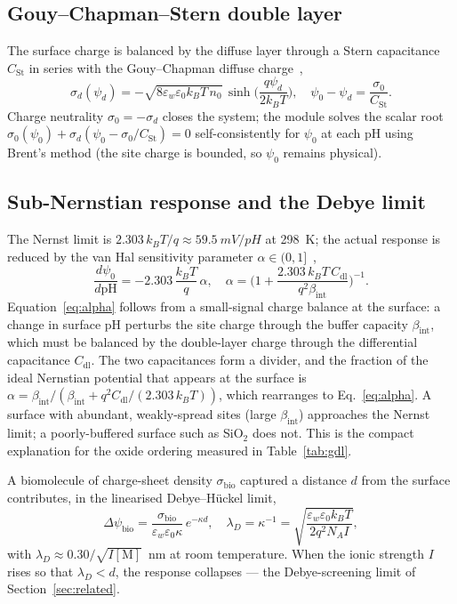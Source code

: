 \documentclass[10pt,journal]{IEEEtran}
\begin{document}
\subsection{Gouy--Chapman--Stern double layer}
The surface charge is balanced by the diffuse layer through a Stern capacitance
$C_{\mathrm{St}}$ in series with the Gouy--Chapman diffuse charge~\cite{grahame1947,bard2001},
\begin{equation}
  \sigma_d(\psi_d)=-\sqrt{8\varepsilon_w\varepsilon_0 k_BT\,n_0}\,
  \sinh\!\Big(\frac{q\psi_d}{2k_BT}\Big),\quad
  \psi_0-\psi_d=\frac{\sigma_0}{C_{\mathrm{St}}}.
  \label{eq:gc}
\end{equation}
Charge neutrality $\sigma_0=-\sigma_d$ closes the system; the module solves the
scalar root
$\sigma_0(\psi_0)+\sigma_d(\psi_0-\sigma_0/C_{\mathrm{St}})=0$
self-consistently for $\psi_0$ at each pH using Brent's method (the site charge is
bounded, so $\psi_0$ remains physical).

\subsection{Sub-Nernstian response and the Debye limit}
The Nernst limit is $2.303\,k_BT/q\approx\SI{59.5}{mV/pH}$ at \SI{298}{K}; the
actual response is reduced by the van Hal sensitivity parameter
$\alpha\in(0,1]$~\cite{vanhal1996},
\begin{equation}
  \frac{d\psi_0}{d\mathrm{pH}}=-2.303\,\frac{k_BT}{q}\,\alpha,\quad
  \alpha=\Big(1+\frac{2.303\,k_BT\,C_{\mathrm{dl}}}{q^2\beta_{\mathrm{int}}}\Big)^{-1}.
  \label{eq:alpha}
\end{equation}
Equation~\eqref{eq:alpha} follows from a small-signal charge balance at the
surface: a change in surface pH perturbs the site charge through the buffer
capacity $\beta_{\mathrm{int}}$, which must be balanced by the double-layer charge
through the differential capacitance $C_{\mathrm{dl}}$. The two capacitances form
a divider, and the fraction of the ideal Nernstian potential that appears at the
surface is $\alpha=\beta_{\mathrm{int}}/(\beta_{\mathrm{int}}+q^2 C_{\mathrm{dl}}/(2.303\,k_BT))$,
which rearranges to Eq.~\eqref{eq:alpha}. A surface with abundant, weakly-spread
sites (large $\beta_{\mathrm{int}}$) approaches the Nernst limit; a poorly-buffered
surface such as SiO$_2$ does not. This is the compact explanation for the oxide
ordering measured in Table~\ref{tab:gdl}.

A biomolecule of charge-sheet density $\sigma_{\mathrm{bio}}$ captured a distance
$d$ from the surface contributes, in the linearised Debye--H\"uckel limit,
\begin{equation}
  \Delta\psi_{\mathrm{bio}}=\frac{\sigma_{\mathrm{bio}}}{\varepsilon_w\varepsilon_0\kappa}\,
  e^{-\kappa d},\quad
  \lambda_D=\kappa^{-1}=\sqrt{\frac{\varepsilon_w\varepsilon_0 k_BT}{2q^2N_AI}},
  \label{eq:debye}
\end{equation}
with $\lambda_D\approx 0.30/\sqrt{I[\mathrm{M}]}$~nm at room temperature. When the
ionic strength $I$ rises so that $\lambda_D<d$, the response collapses --- the
Debye-screening limit of Section~\ref{sec:related}.
\end{document}
